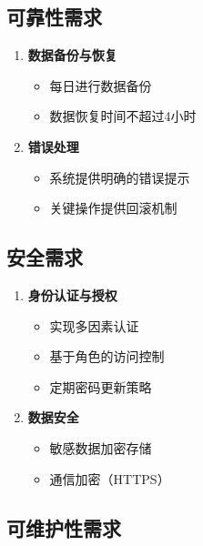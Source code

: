 \documentclass[a4paper,12pt]{article}
\begin{document}
\subsection{可靠性需求}

\begin{enumerate}
  
  \item \textbf{数据备份与恢复}
  \begin{itemize}
    \item 每日进行数据备份
    \item 数据恢复时间不超过4小时
  \end{itemize}
  
  \item \textbf{错误处理}
  \begin{itemize}
    \item 系统提供明确的错误提示
    \item 关键操作提供回滚机制
  \end{itemize}
\end{enumerate}

\subsection{安全需求}

\begin{enumerate}
  \item \textbf{身份认证与授权}
  \begin{itemize}
    \item 实现多因素认证
    \item 基于角色的访问控制
    \item 定期密码更新策略
  \end{itemize}
  
  \item \textbf{数据安全}
  \begin{itemize}
    \item 敏感数据加密存储
    \item 通信加密（HTTPS）
  \end{itemize}
  
\end{enumerate}

\subsection{可维护性需求}
\end{document}
